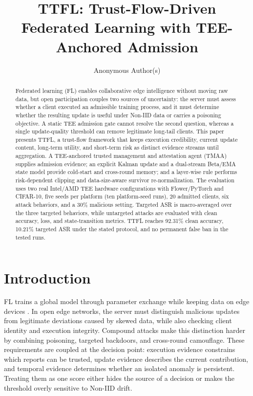\documentclass[runningheads,orivec]{llncs}
\begin{document}
\title{TTFL: Trust-Flow-Driven Federated Learning with TEE-Anchored Admission}

\author{Anonymous Author(s)}
\institute{}

\maketitle

\begin{abstract}
    Federated learning (FL) enables collaborative edge intelligence without moving raw data, but open participation couples two sources of uncertainty: the server must assess whether a client executed an admissible training process, and it must determine whether the resulting update is useful under Non-IID data or carries a poisoning objective. A static TEE admission gate cannot resolve the second question, whereas a single update-quality threshold can remove legitimate long-tail clients. This paper presents TTFL, a trust-flow framework that keeps execution credibility, current update content, long-term utility, and short-term risk as distinct evidence streams until aggregation. A TEE-anchored trusted management and attestation agent (TMAA) supplies admission evidence; an explicit Kalman update and a dual-stream Beta/EMA state model provide cold-start and cross-round memory; and a layer-wise rule performs risk-dependent clipping and data-size-aware survivor re-normalization. The evaluation uses two real Intel/AMD TEE hardware configurations with Flower/PyTorch and CIFAR-10, five seeds per platform (ten platform-seed runs), 20 admitted clients, six attack behaviors, and a 30\% malicious setting. Targeted ASR is macro-averaged over the three targeted behaviors, while untargeted attacks are evaluated with clean accuracy, loss, and state-transition metrics. TTFL reaches 92.31\% clean accuracy, 10.21\% targeted ASR under the stated protocol, and no permanent false ban in the tested runs.
\end{abstract}

\section{Introduction}

FL trains a global model through parameter exchange while keeping data on edge devices \cite{kairouz2021flsurvey,mcmahan2017fedavg}. In open edge networks, the server must distinguish malicious updates from legitimate deviations caused by skewed data, while also checking client identity and execution integrity. Compound attacks make this distinction harder by combining poisoning, targeted backdoors, and cross-round camouflage. These requirements are coupled at the decision point: execution evidence constrains which reports can be trusted, update evidence describes the current contribution, and temporal evidence determines whether an isolated anomaly is persistent. Treating them as one score either hides the source of a decision or makes the threshold overly sensitive to Non-IID drift.
\end{document}
